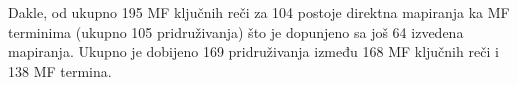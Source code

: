 Dakle, od ukupno 195 MF ključnih reči za 104 postoje direktna mapiranja ka MF
terminima (ukupno 105 pridruživanja) što je dopunjeno sa još  64 izvedena
mapiranja.  Ukupno je dobijeno 169 pridruživanja između 168 MF ključnih reči i
138 MF termina.



%
%
%



